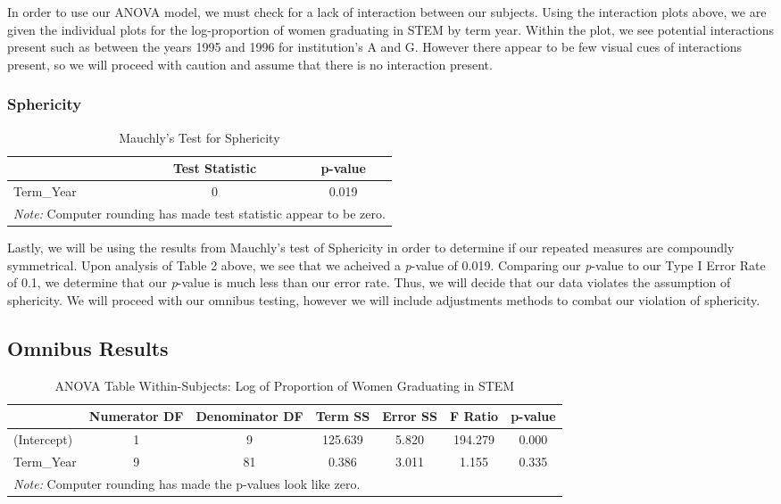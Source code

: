 \documentclass[]{article}
\begin{document}
In order to use our ANOVA model, we must check for a lack of interaction
between our subjects. Using the interaction plots above, we are given
the individual plots for the log-proportion of women graduating in STEM
by term year. Within the plot, we see potential interactions present
such as between the years 1995 and 1996 for institution's A and G.
However there appear to be few visual cues of interactions present, so
we will proceed with caution and assume that there is no interaction
present.

\subsubsection{Sphericity}\label{sphericity}

\begin{table}[H]

\caption{\label{tab:Sphericity}Mauchly's Test for Sphericity}
\centering
\fontsize{12}{14}\selectfont
\begin{tabular}[t]{l|c|c}
\hline
  & Test Statistic & p-value\\
\hline
Term\_Year & 0 & 0.019\\
\hline
\multicolumn{3}{l}{\textit{Note: } Computer rounding has made test statistic appear to be zero.}\\
\end{tabular}
\end{table}

Lastly, we will be using the results from Mauchly's test of Sphericity
in order to determine if our repeated measures are compoundly
symmetrical. Upon analysis of Table 2 above, we see that we acheived a
\emph{p}-value of 0.019. Comparing our \emph{p}-value to our Type I
Error Rate of 0.1, we determine that our \emph{p}-value is much less
than our error rate. Thus, we will decide that our data violates the
assumption of sphericity. We will proceed with our omnibus testing,
however we will include adjustments methods to combat our violation of
sphericity.

\subsection{Omnibus Results}\label{omnibus-results}

\begin{table}[H]

\caption{\label{tab:univariate Results}ANOVA Table Within-Subjects: Log of Proportion of Women Graduating in STEM}
\centering
\fontsize{12}{14}\selectfont
\begin{tabular}[t]{l|c|c|c|c|c|c}
\hline
  & Numerator DF & Denominator DF & Term SS & Error SS & F Ratio & p-value\\
\hline
(Intercept) & 1 & 9 & 125.639 & 5.820 & 194.279 & 0.000\\
\hline
Term\_Year & 9 & 81 & 0.386 & 3.011 & 1.155 & 0.335\\
\hline
\multicolumn{7}{l}{\textit{Note: } Computer rounding has made the p-values look like zero.}\\
\end{tabular}
\end{table}
\end{document}
